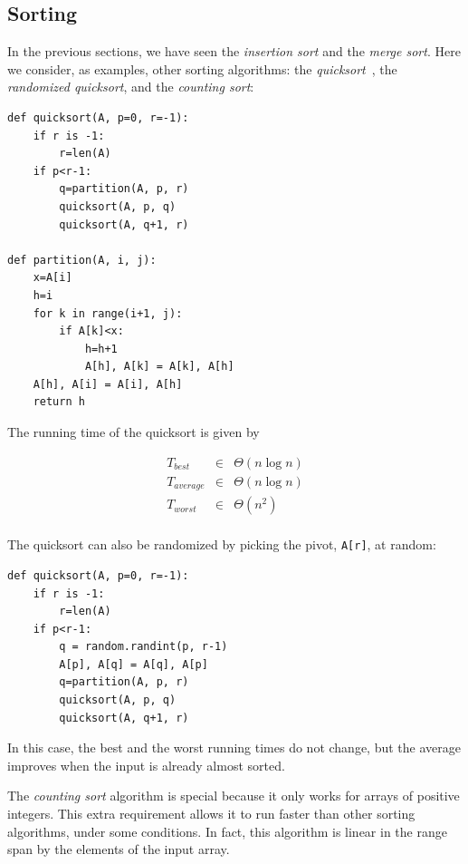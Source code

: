 \documentclass[justified, sixbynine]{tufte-book}
\def\ft{\small\tt}
\theoremstyle{plain}%
\newtheorem * {corollary}{Corollary}
\theoremstyle{definition}
\theoremstyle{remark}
\newtheorem * {remark}{Remark}
\newtheorem * {note}{Note}
\begin{document}
\begin{fullwidth}
\goodbreak\subsection{Sorting}


In the previous sections, we have seen the {\it insertion sort} and the {\it merge sort}. Here we consider, as examples, other sorting algorithms: the {\it quicksort}~\cite{mergesort}, the {\it randomized quicksort}, and the {\it counting sort}:

\begin{lstlisting}
def quicksort(A, p=0, r=-1):
    if r is -1:
        r=len(A)
    if p<r-1:
        q=partition(A, p, r)
        quicksort(A, p, q)
        quicksort(A, q+1, r)

def partition(A, i, j):
    x=A[i]
    h=i
    for k in range(i+1, j):
        if A[k]<x:
            h=h+1
            A[h], A[k] = A[k], A[h]
    A[h], A[i] = A[i], A[h]
    return h
\end{lstlisting}

The running time of the quicksort is given by

\begin{eqnarray}
T_{best} &\in &\Theta (n\log n) \\
T_{average} &\in &\Theta (n\log n) \\
T_{worst} &\in &\Theta (n^2) \\
\end{eqnarray}

The quicksort can also be randomized by picking the pivot, {\ft A[r]}, at random:
\begin{lstlisting}
def quicksort(A, p=0, r=-1):
    if r is -1:
        r=len(A)
    if p<r-1:
        q = random.randint(p, r-1)
        A[p], A[q] = A[q], A[p]
        q=partition(A, p, r)
        quicksort(A, p, q)
        quicksort(A, q+1, r)
\end{lstlisting}

In this case, the best and the worst running times do not change, but the average improves when the input is already almost sorted.


The {\it counting sort} algorithm is special because it only works for arrays of positive integers. This extra requirement allows it to run faster than other sorting algorithms, under some conditions. In fact, this algorithm is linear in the range span by the elements of the input array.


\end{fullwidth}
\end{document}
